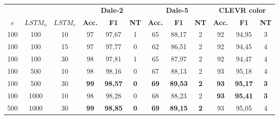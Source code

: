 \begin{table}[ht]
    \centering
    \begin{tabular}{ccc|ccc|ccc|ccc}
        \toprule
               &          &          & \multicolumn{3}{c}{\textbf{Dale-2}} & \multicolumn{3}{c}{\textbf{Dale-5}} & \multicolumn{3}{c}{\textbf{CLEVR color}}                                                                                               \\\cmidrule(lr){4-6}\cmidrule(lr){7-9}\cmidrule(lr){10-12}
        $e$    & $LSTM_o$ & $LSTM_e$ & \textbf{Acc.}                       & \textbf{F1}                         & \textbf{NT}                              & \textbf{Acc.} & \textbf{F1}    & \textbf{NT} & \textbf{Acc.} & \textbf{F1}    & \textbf{NT} \\\midrule
        {100}  & {100}    & {10}     & {97}                                & {97,67}                             & {1}                                      & {65}          & {88,17}        & {2}         & {92}          & {94,95}        & {3}         \\
        {100}  & {100}    & {15}     & {97}                                & {97,77}                             & {0}                                      & {62}          & {86,51}        & {2}         & {92}          & {94,45}        & {4}         \\
        {100}  & {100}    & {30}     & {98}                                & {97,81}                             & {1}                                      & {65}          & {87,97}        & {2}         & {92}          & {94,47}        & {4}         \\
        {100}  & {500}    & {10}     & {98}                                & {98,16}                             & {0}                                      & {67}          & {88,13}        & {2}         & {93}          & {95,18}        & {4}         \\
        {100}  & {500}    & {30}     & \textbf{99}                         & \textbf{98,57}                      & \textbf{0}                               & \textbf{69}   & \textbf{89,53} & \textbf{2}  & \textbf{93}   & \textbf{95,17} & \textbf{3}  \\
        {100}  & {1000}   & {10}     & {98}                                & {98,28}                             & {0}                                      & {68}          & {88,23}        & {2}         & \textbf{93}   & \textbf{95,41} & \textbf{3}  \\
        {500}  & {1000}   & {30}     & \textbf{99}                         & \textbf{98,85}                      & \textbf{0}                               & \textbf{69}   & \textbf{89,15} & \textbf{2}  & {93}          & {95,05}        & {4}         \\

\end{tabular}
\end{table}
